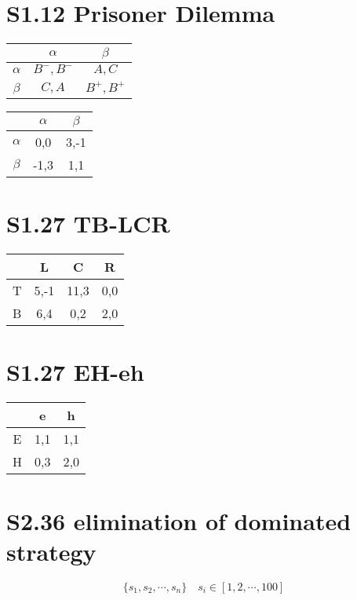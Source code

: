 \documentclass[12pt,a4paper]{article}
\author{surecalois}
\begin{document}
\section{S1.12 Prisoner Dilemma}

\begin{center}
\begin{tabular}{c|cc}
 & $\alpha$ & $\beta$ \\
 \hline
$\alpha$ & $B^{-},B^{-}$ & $A,C$ \\
 $\beta$ & $C,A$ & $B^{+},B^{+}$ \\
\end{tabular}
\end{center}

\begin{center}
\begin{tabular}{c|cc}
 & $\alpha$ & $\beta$ \\
 \hline
$\alpha$ & 0,0 & 3,-1 \\
 $\beta$ & -1,3 & 1,1 \\
\end{tabular}
\end{center}


\section{S1.27 TB-LCR}

\begin{center}
\begin{tabular}{c|ccc}
 & L & C & R \\
 \hline
T & 5,-1 & 11,3 & 0,0 \\
B & 6,4 & 0,2 & 2,0 \\
\end{tabular}
\end{center}


\section{S1.27 EH-eh}

\begin{center}
\begin{tabular}{c|cc}
 & e & h \\
 \hline
 E & 1,1 & 1,1 \\
 H & 0,3 & 2,0 \\
\end{tabular}
\end{center}


\section{S2.36 elimination of dominated strategy}
\[
\{s_1,s_2,\cdots,s_n\} \quad s_i \in [1,2,\cdots,100]
\]
\end{document}
